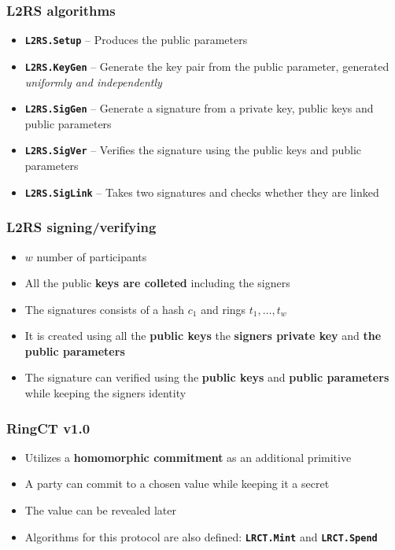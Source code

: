 \documentclass[%
  14pt,       				%
	c,                  %
	aspectratio=1610,   %
	unicode,						%
]{beamer}				    	%
\begin{document}
\begin{frame}
	\frametitle{L2RS algorithms}
	\large{
		\begin{itemize}
			\item \textbf{\texttt{L2RS.Setup}} -- Produces the public parameters
			\item \textbf{\texttt{L2RS.KeyGen}} -- Generate the key pair from the public parameter, generated \textit{uniformly and independently}
			\item \textbf{\texttt{L2RS.SigGen}} -- Generate a signature from a private key, public keys and public parameters
			\item \textbf{\texttt{L2RS.SigVer}} -- Verifies the signature using the public keys and public parameters
			\item \textbf{\texttt{L2RS.SigLink}} -- Takes two signatures and checks whether they are linked
		\end{itemize}
	}
\end{frame}

\begin{frame}
  \frametitle{L2RS signing/verifying}
  \large{
    \begin{itemize}
      \item $w$ number of participants
      \item All the public \textbf{keys are colleted} including the signers
      \item The signatures consists of a hash $c_1$ and rings $t_1,\dots,t_w$
      \item It is created using all the \textbf{public keys} the \textbf{signers private key} and \textbf{the public parameters}
      \item The signature can verified using the \textbf{public keys} and \textbf{public parameters} while keeping the signers identity
    \end{itemize}
  }
\end{frame}

\begin{frame}
  \frametitle{RingCT v1.0}
  \large{
    \begin{itemize}
      \item Utilizes a \textbf{homomorphic commitment} as an additional primitive
      \item A party can commit to a chosen value while keeping it a secret
      \item The value can be revealed later
      \item Algorithms for this protocol are also defined: \textbf{\texttt{LRCT.Mint}} and \textbf{\texttt{LRCT.Spend}}
    \end{itemize}
  }
\end{frame}
\end{document}

